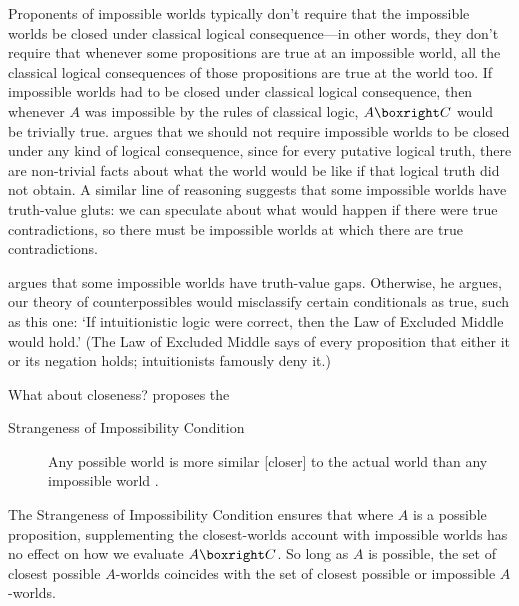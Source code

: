 Proponents of impossible worlds typically don't require that the impossible worlds be closed under classical logical consequence---in other words, they don't require that whenever some propositions are true at an impossible world, all the classical logical consequences of those propositions are true at the world too.  If impossible worlds had to be closed under classical logical consequence, then whenever $A$ was impossible by the rules of classical logic, $A \boxright C$ would be trivially true.  \citet[547]{Nolan1997-DANIWA} argues that we should not require impossible worlds to be closed under any kind of logical consequence, since for every putative logical truth, there are non-trivial facts about what the world would be like if that logical truth did not obtain.   A similar line of reasoning suggests that some impossible worlds have truth-value gluts: we can speculate about what would happen if there were true contradictions, so there must be impossible worlds at which there are true contradictions.

\citet{Bjerring2013-BJEOC} argues that some impossible worlds have truth-value gaps.  Otherwise, he argues, our theory of counterpossibles would misclassify certain conditionals as true, such as this one: `If intuitionistic logic were correct, then the Law of Excluded Middle would hold.'  (The Law of Excluded Middle says of every proposition that either it or its negation holds; intuitionists famously deny it.)

What about closeness? \citet{Nolan1997-DANIWA} proposes the
\begin{description}
\item[Strangeness of Impossibility Condition] Any possible world is more similar [closer] to the actual world than any impossible world \citep[550]{Nolan1997-DANIWA}.
\end{description}
The Strangeness of Impossibility Condition ensures that where $A$ is a possible proposition, supplementing the closest-worlds account with impossible worlds has no effect on how we evaluate $A \boxright C$.  So long as $A$ is possible, the set of closest possible $A$-worlds coincides with the set of closest possible or impossible $A$-worlds.

